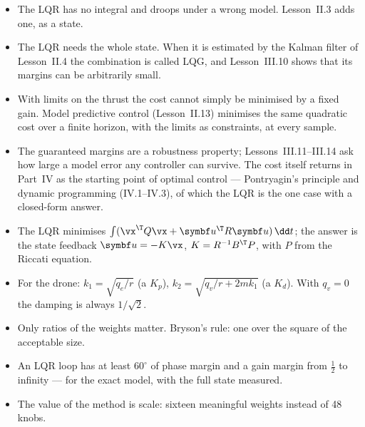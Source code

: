 \begin{lookahead}
\begin{itemize}[leftmargin=1.2em]
  \item The LQR has no integral and droops under a wrong model. Lesson~II.3 adds one, as a state.
  \item The LQR needs the whole state. When it is estimated by the Kalman filter of Lesson~II.4 the combination is called LQG, and Lesson~III.10 shows that its margins can be arbitrarily small.
  \item With limits on the thrust the cost cannot simply be minimised by a fixed gain. Model predictive control (Lesson~II.13) minimises the same quadratic cost over a finite horizon, with the limits as constraints, at every sample.
  \item The guaranteed margins are a robustness property; Lessons~III.11–III.14 ask how large a model error any controller can survive. The cost itself returns in Part~IV as the starting point of optimal control — Pontryagin's principle and dynamic programming (IV.1–IV.3), of which the LQR is the one case with a closed-form answer.
\end{itemize}
\end{lookahead}

\begin{remember}
\begin{itemize}
  \item The LQR minimises $\int(\vx^\T Q\vx + \symbf u^\T R\symbf u)\,\dd t$; the answer is the state feedback $\symbf u = -K\vx$, $K = R^{-1}B^\T P$, with $P$ from the Riccati equation.
  \item For the drone: $k_1 = \sqrt{q_e/r}$ (a $K_p$), $k_2 = \sqrt{q_v/r + 2mk_1}$ (a $K_d$). With $q_v = 0$ the damping is always $1/\sqrt2$.
  \item Only ratios of the weights matter. Bryson's rule: one over the square of the acceptable size.
  \item An LQR loop has at least $60^\circ$ of phase margin and a gain margin from $\tfrac12$ to infinity — for the exact model, with the full state measured.
  \item The value of the method is scale: sixteen meaningful weights instead of 48 knobs.
\end{itemize}
\end{remember}

